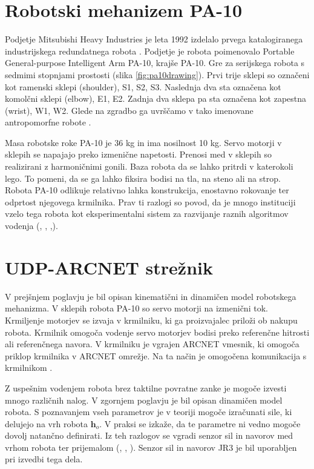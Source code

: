 \documentclass[a4paper]{article}
\begin{document}
\section{Robotski mehanizem PA-10}

Podjetje Mitsubishi Heavy Industries je leta 1992 izdelalo prvega katalogiranega industrijskega redundatnega robota \cite{mhi_pa10}. Podjetje je robota poimenovalo Portable General-purpose Intelligent Arm PA-10, krajše PA-10. Gre za serijskega robota s sedmimi stopnjami prostosti (slika \ref{fig:pa10drawing}). Prvi trije sklepi so označeni kot ramenski sklepi (shoulder), S1, S2, S3. Naslednja dva sta označena kot komolčni sklepi (elbow), E1, E2. Zadnja dva sklepa pa sta označena kot zapestna (wrist), W1, W2. Glede na zgradbo ga uvrščamo v tako imenovane antropomorfne robote \cite{craig_robintro}.

Masa robotske roke PA-10 je 36 kg in ima nosilnost 10 kg. Servo motorji v sklepih se napajajo preko izmenične napetosti. Prenosi med v sklepih so realizirani z harmoničnimi gonili. Baza robota da se lahko pritrdi v katerokoli lego. To pomeni, da se ga lahko fiksira bodisi na tla, na steno ali na strop. Robota PA-10 odlikuje relativno lahka konstrukcija, enostavno rokovanje ter odprtost njegovega krmilnika. Prav ti razlogi so povod, da je mnogo instituciji vzelo tega robota kot eksperimentalni sistem za razvijanje raznih algoritmov vodenja (\cite{voung_pa10}, \cite{aalst_pa10}, \cite{rodrigo_pa10},\cite{petric_nevronska}).

\section{UDP-ARCNET strežnik}

V prejšnjem poglavju je bil opisan kinematični in dinamičen model robotskega mehanizma. V sklepih robota PA-10 so servo motorji na izmenični tok. Krmiljenje motorjev se izvaja v krmilniku, ki ga proizvajalec priloži ob nakupu robota. Krmilnik omogoča vodenje servo motorjev bodisi preko referenčne hitrosti ali referenčnega navora. V krmilniku je vgrajen ARCNET vmesnik, ki omogoča priklop krmilnika v ARCNET omrežje. Na ta način je omogočena komunikacija s krmilnikom \cite{pa10-manual}.

Z uspešnim vodenjem robota brez taktilne povratne zanke je mogoče izvesti mnogo različnih nalog. V zgornjem poglavju je bil opisan dinamičen model robota. S poznavanjem vseh parametrov je v teoriji mogoče izračunati sile, ki delujejo na vrh robota $\textbf{h}_o$. V praksi se izkaže, da te parametre ni vedno mogoče dovolj natančno definirati. Iz teh razlogov se vgradi senzor sil in navorov med vrhom robota ter prijemalom (\cite{almassri_pressure_sensor}, \cite{mihelj_vodenje}, \cite{eppinger_force_dynamics}). Senzor sil in navorov JR3 je bil uporabljen pri izvedbi tega dela.
\end{document}
